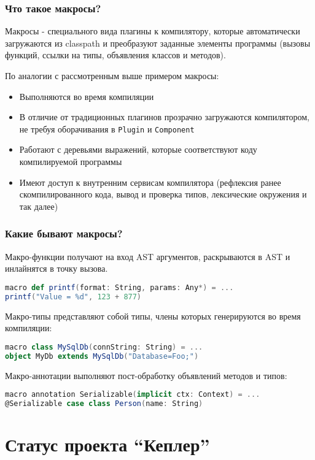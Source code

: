 \documentclass[hyperref={bookmarks=false}]{beamer}
\begin{document}
\begin{frame}[t,fragile]
\frametitle{Что такое макросы?}

Макросы - специального вида плагины к компилятору, которые автоматически загружаются из classpath и преобразуют заданные элементы программы (вызовы функций, ссылки на типы, объявления классов и методов).

По аналогии с рассмотренным выше примером макросы:
\begin{itemize}
\item Выполняются во время компиляции
\item В отличие от традиционных плагинов прозрачно загружаются компилятором, не требуя оборачивания в \texttt{Plugin} и \texttt{Component}
\item Работают с деревьями выражений, которые соответствуют коду компилируемой программы
\item Имеют доступ к внутренним сервисам компилятора (рефлексия ранее скомпилированного кода, вывод и проверка типов, лексические окружения и так далее)
\end{itemize}
\end{frame}


\begin{frame}[t,fragile]
\frametitle{Какие бывают макросы?}

Макро-функции получают на вход AST аргументов, раскрываются в AST и инлайнятся в точку вызова.

\begin{lstlisting}[language=scala]
macro def printf(format: String, params: Any*) = ...
printf("Value = %d", 123 + 877)
\end{lstlisting}

Макро-типы представляют собой типы, члены которых генерируются во время компиляции:

\begin{lstlisting}[language=scala]
macro class MySqlDb(connString: String) = ...
object MyDb extends MySqlDb("Database=Foo;")
\end{lstlisting}

Макро-аннотации выполняют пост-обработку объявлений методов и типов:

\begin{lstlisting}[language=scala]
macro annotation Serializable(implicit ctx: Context) = ...
@Serializable case class Person(name: String)
\end{lstlisting}
\end{frame}

\section{Статус проекта ``Кеплер''}
\end{document}
